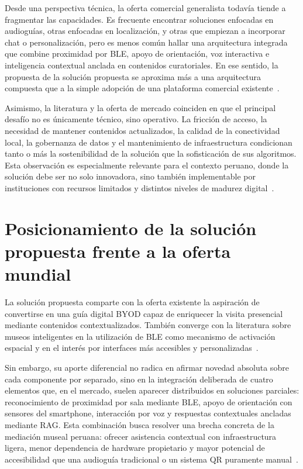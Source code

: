 Desde una perspectiva técnica, la oferta comercial generalista todavía tiende a fragmentar las capacidades. Es frecuente encontrar soluciones enfocadas en audioguías, otras enfocadas en localización, y otras que empiezan a incorporar chat o personalización, pero es menos común hallar una arquitectura integrada que combine proximidad por BLE, apoyo de orientación, voz interactiva e inteligencia contextual anclada en contenidos curatoriales. En ese sentido, la propuesta de la solución propuesta se aproxima más a una arquitectura compuesta que a la simple adopción de una plataforma comercial existente~\cite{verde2023blemuseum,wang2024voiceguide,lewis2020rag,bechard2024hallucination}.

Asimismo, la literatura y la oferta de mercado coinciden en que el principal desafío no es únicamente técnico, sino operativo. La fricción de acceso, la necesidad de mantener contenidos actualizados, la calidad de la conectividad local, la gobernanza de datos y el mantenimiento de infraestructura condicionan tanto o más la sostenibilidad de la solución que la sofisticación de sus algoritmos. Esta observación es especialmente relevante para el contexto peruano, donde la solución debe ser no solo innovadora, sino también implementable por instituciones con recursos limitados y distintos niveles de madurez digital~\cite{sala2025museumapps,museoscultura,osiptel2024smartphone,cultura2024reporte}.

\section{Posicionamiento de la solución propuesta frente a la oferta mundial}

La solución propuesta comparte con la oferta existente la aspiración de convertirse en una guía digital BYOD capaz de enriquecer la visita presencial mediante contenidos contextualizados. También converge con la literatura sobre museos inteligentes en la utilización de BLE como mecanismo de activación espacial y en el interés por interfaces más accesibles y personalizadas~\cite{verde2023blemuseum,ivanov2025smartmuseums,wang2024voiceguide}.

Sin embargo, su aporte diferencial no radica en afirmar novedad absoluta sobre cada componente por separado, sino en la integración deliberada de cuatro elementos que, en el mercado, suelen aparecer distribuidos en soluciones parciales: reconocimiento de proximidad por sala mediante BLE, apoyo de orientación con sensores del smartphone, interacción por voz y respuestas contextuales ancladas mediante RAG. Esta combinación busca resolver una brecha concreta de la mediación museal peruana: ofrecer asistencia contextual con infraestructura ligera, menor dependencia de hardware propietario y mayor potencial de accesibilidad que una audioguía tradicional o un sistema QR puramente manual~\cite{android2026positionsensors,aws2026rag,locatifymuseum,naviginemuseums}.

